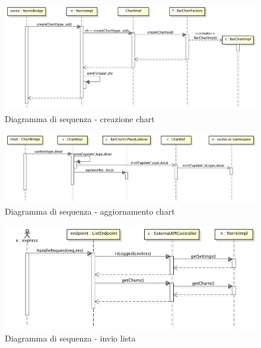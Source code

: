 
        


            \begin{figure}[H]
                \centering
                \includegraphics[scale=0.3]{DefinizioneDiProdotto/Pics/CreazioneChart}
                \caption{Diagramma di sequenza - creazione chart}
            \end{figure}


            \begin{figure}[H]
                \centering
                \includegraphics[scale=0.3]{DefinizioneDiProdotto/Pics/AggiornamentoChart}
                \caption{Diagramma di sequenza - aggiornamento chart}
            \end{figure}

            
            \begin{figure}[H]
                \centering
                \includegraphics[scale=0.3]{DefinizioneDiProdotto/Pics/InvioLista}
                \caption{Diagramma di sequenza - invio lista}
            \end{figure}

